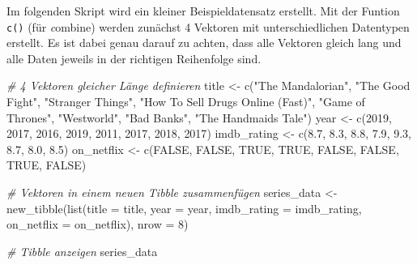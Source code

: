 \documentclass[
]{book}
\newenvironment{Shaded}{\begin{snugshade}}{\end{snugshade}}
\newcommand{\AttributeTok}[1]{\textcolor[rgb]{0.77,0.63,0.00}{#1}}
\newcommand{\CommentTok}[1]{\textcolor[rgb]{0.56,0.35,0.01}{\textit{#1}}}
\newcommand{\ConstantTok}[1]{\textcolor[rgb]{0.00,0.00,0.00}{#1}}
\newcommand{\DecValTok}[1]{\textcolor[rgb]{0.00,0.00,0.81}{#1}}
\newcommand{\FloatTok}[1]{\textcolor[rgb]{0.00,0.00,0.81}{#1}}
\newcommand{\FunctionTok}[1]{\textcolor[rgb]{0.00,0.00,0.00}{#1}}
\newcommand{\NormalTok}[1]{#1}
\newcommand{\OtherTok}[1]{\textcolor[rgb]{0.56,0.35,0.01}{#1}}
\newcommand{\StringTok}[1]{\textcolor[rgb]{0.31,0.60,0.02}{#1}}
\begin{document}
Im folgenden Skript wird ein kleiner Beispieldatensatz erstellt. Mit der Funtion \texttt{c()} (für \emph{c}ombine) werden zunächst 4 Vektoren mit unterschiedlichen Datentypen erstellt. Es ist dabei genau darauf zu achten, dass alle Vektoren gleich lang und alle Daten jeweils in der richtigen Reihenfolge sind.

\begin{Shaded}
\begin{Highlighting}[]
\CommentTok{\# 4 Vektoren gleicher Länge definieren}
\NormalTok{title        }\OtherTok{\textless{}{-}} \FunctionTok{c}\NormalTok{(}\StringTok{"The Mandalorian"}\NormalTok{, }\StringTok{"The Good Fight"}\NormalTok{, }\StringTok{"Stranger Things"}\NormalTok{, }
                  \StringTok{"How To Sell Drugs Online (Fast)"}\NormalTok{, }\StringTok{"Game of Thrones"}\NormalTok{,}
                  \StringTok{"Westworld"}\NormalTok{, }\StringTok{"Bad Banks"}\NormalTok{, }\StringTok{"The Handmaid\textquotesingle{}s Tale"}\NormalTok{)}
\NormalTok{year         }\OtherTok{\textless{}{-}} \FunctionTok{c}\NormalTok{(}\DecValTok{2019}\NormalTok{, }\DecValTok{2017}\NormalTok{, }\DecValTok{2016}\NormalTok{, }\DecValTok{2019}\NormalTok{, }\DecValTok{2011}\NormalTok{, }\DecValTok{2017}\NormalTok{, }\DecValTok{2018}\NormalTok{, }\DecValTok{2017}\NormalTok{)}
\NormalTok{imdb\_rating  }\OtherTok{\textless{}{-}} \FunctionTok{c}\NormalTok{(}\FloatTok{8.7}\NormalTok{, }\FloatTok{8.3}\NormalTok{, }\FloatTok{8.8}\NormalTok{, }\FloatTok{7.9}\NormalTok{, }\FloatTok{9.3}\NormalTok{, }\FloatTok{8.7}\NormalTok{, }\FloatTok{8.0}\NormalTok{, }\FloatTok{8.5}\NormalTok{)}
\NormalTok{on\_netflix   }\OtherTok{\textless{}{-}} \FunctionTok{c}\NormalTok{(}\ConstantTok{FALSE}\NormalTok{, }\ConstantTok{FALSE}\NormalTok{, }\ConstantTok{TRUE}\NormalTok{, }\ConstantTok{TRUE}\NormalTok{, }\ConstantTok{FALSE}\NormalTok{, }\ConstantTok{FALSE}\NormalTok{, }\ConstantTok{TRUE}\NormalTok{, }\ConstantTok{FALSE}\NormalTok{)}

\CommentTok{\# Vektoren in einem neuen Tibble zusammenfügen}
\NormalTok{series\_data }\OtherTok{\textless{}{-}} \FunctionTok{new\_tibble}\NormalTok{(}\FunctionTok{list}\NormalTok{(}\AttributeTok{title =}\NormalTok{ title, }
                          \AttributeTok{year =}\NormalTok{ year, }
                          \AttributeTok{imdb\_rating =}\NormalTok{ imdb\_rating, }
                          \AttributeTok{on\_netflix =}\NormalTok{ on\_netflix),}
                          \AttributeTok{nrow =} \DecValTok{8}\NormalTok{) }

\CommentTok{\# Tibble anzeigen}
\NormalTok{series\_data}
\end{Highlighting}
\end{Shaded}
\end{document}
